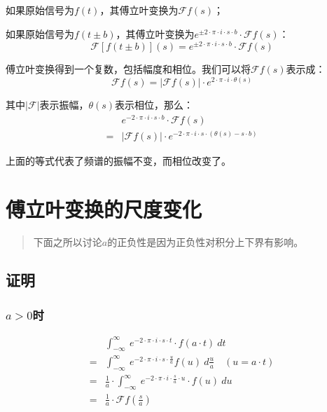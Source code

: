 如果原始信号为$f(t)$，其傅立叶变换为$\mathcal{F}f(s)$；

如果原始信号为$f(t\pm b)$，其傅立叶变换为$e^{\pm 2\cdot \pi\cdot i\cdot s\cdot b}\cdot \mathcal{F}f(s)$：
\begin{equation}
	\mathcal{F}[f(t\pm b)](s)=e^{\pm 2\cdot \pi\cdot i\cdot s\cdot b}\cdot \mathcal{F}f(s)
\end{equation}

傅立叶变换得到一个复数，包括幅度和相位。我们可以将$\mathcal{F}f(s)$表示成：
$$
	\mathcal{F}f(s)=|\mathcal{F}f(s)|\cdot e^{2\cdot \pi\cdot i\cdot \theta(s)}
$$

其中$|\mathcal{F}|$表示振幅，$\theta(s)$表示相位，那么：
\begin{align*}
	  & e^{-2\cdot \pi\cdot i\cdot s\cdot b}\cdot \mathcal{F}f(s)                      \\
	= & |\mathcal{F}f(s)|\cdot e^{-2\cdot \pi\cdot i\cdot s\cdot (\theta(s)-s\cdot b)}
\end{align*}


上面的等式代表了频谱的振幅不变，而相位改变了。

\section{傅立叶变换的尺度变化}
\begin{quote}
	下面之所以讨论$a$的正负性是因为正负性对积分上下界有影响。
\end{quote}
\subsection{证明}
\subsubsection{$a>0$时}
\begin{align*}
	  & \int_{-\infty}^{\infty}\ e^{-2\cdot \pi\cdot i\cdot s\cdot t}\cdot f(a\cdot t)\ dt                          \\
	= & \int_{-\infty}^{\infty}\ e^{-2\cdot \pi\cdot i\cdot s\cdot \frac{u}{a}}f(u)\ d\frac{u}{a}\quad (u=a\cdot t) \\
	= & \frac{1}{a}\cdot \int_{-\infty}^{\infty}\ e^{-2\cdot \pi\cdot i\cdot \frac{s}{a}\cdot u}\cdot f(u)\ du      \\
	= & \frac{1}{a}\cdot \mathcal{F}f(\frac{s}{a})
\end{align*}
